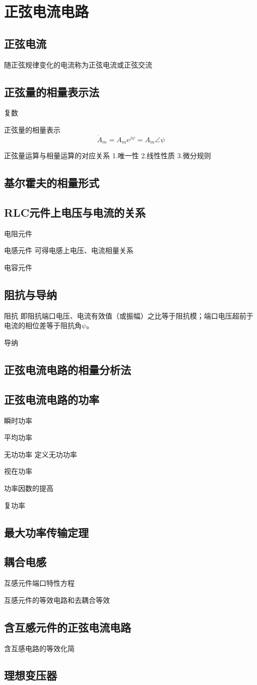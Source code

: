 \chapter{正弦电流电路}

\section{正弦电流}
随正弦规律变化的电流称为正弦电流或正弦交流

\section{正弦量的相量表示法}
复数

正弦量的相量表示
\[
\dot{A}_m = A_m e^{j\psi} = A_m \angle \psi
\]

正弦量运算与相量运算的对应关系
1.唯一性
2.线性性质
3.微分规则

\section{基尔霍夫的相量形式}

\section{RLC元件上电压与电流的关系}
电阻元件

电感元件
可得电感上电压、电流相量关系
\[
\]

电容元件

\section{阻抗与导纳}
阻抗
即阻抗端口电压、电流有效值（或振幅）之比等于阻抗模；端口电压超前于电流的相位差等于阻抗角$\psi$。

导纳

\section{正弦电流电路的相量分析法}

\section{正弦电流电路的功率}
瞬时功率

平均功率

无功功率
定义无功功率
\[
\]

视在功率

功率因数的提高

复功率

\section{最大功率传输定理}

\section{耦合电感}
互感元件端口特性方程

互感元件的等效电路和去耦合等效

\section{含互感元件的正弦电流电路}
含互感电路的等效化简

\section{理想变压器}